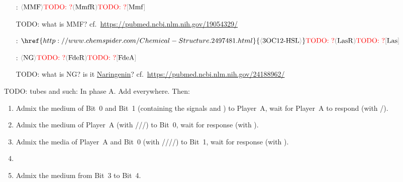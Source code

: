 \documentclass[12pt,notitlepage]{article}
\newcommand{\TODO}[1]{\textrm{\color{red}TODO: #1}}
\newcommand{\cbra}[1]{{\ensuremath{\color{gray}{#1}}}}
\newcommand{\signal}[1]{{{\cbra{\langle}\ce{#1}\cbra{\rangle}}}}
\newcommand{\protein}[1]{{{\cbra{(}\ce{#1}\cbra{)}}}}
\newcommand{\promoter}[1]{{{\cbra{[}\ce{#1}\cbra{]}}}}
\begin{document}
\begin{itemize}
\item[\ce{c_2}:]
    $
        \signal{MMF}
        \TODO{?}
        \protein{MmfR}
        \TODO{?}
        \promoter{Mmf}
    $
    
    \TODO{
    what is MMF?
    cf.~\url{https://pubmed.ncbi.nlm.nih.gov/19054329/}
    }

\item[\ce{s_2}:]
    $
        \href{http://www.chemspider.com/Chemical-Structure.2497481.html}{\signal{{3OC12}{-}HSL}}
        \TODO{?}
        \protein{LasR}
        \TODO{?}
        \promoter{Las}
    $

\item[\ce{c_3}:]
    $
        \signal{NG}
        \TODO{?}
        \protein{FdeR}
        \TODO{?}
        \promoter{FdeA}
    $

    \TODO{
    what is NG? 
    is it 
    \href{https://en.wikipedia.org/wiki/Naringenin}{Naringenin}?
    cf.~\url{https://pubmed.ncbi.nlm.nih.gov/24188962/}
    }
\end{itemize}


\TODO{tubes and such:}
%
In phase A.
%
Add  everywhere.
%
Then:
%
\begin{enumerate}
\item 
    Admix the medium of Bit~0 and Bit~1 
    (containing the signals  and )
    to Player~A,
    wait for Player~A to respond
    (with /).
    
\item
    Admix the medium of Player~A
    (with ///)
    to Bit~0, wait for response
    (with ).
    
\item
    Admix the media of Player~A and Bit~0
    (with ////)
    to Bit~1, wait for response
    (with ). 
    
\item
    
\item
    Admix the medium from Bit~3 to Bit~4.
    
\end{enumerate}
\end{document}
